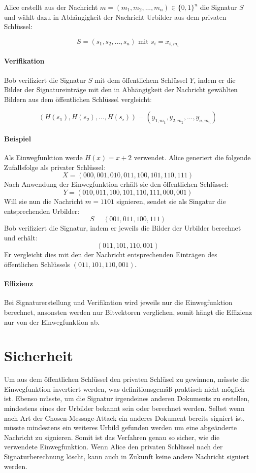 \documentclass[a4paper,12pt,oneside]{scrreprt}
\begin{document}
Alice erstellt aus der Nachricht $m = (m_1, m_2, \dots, m_n) \in \{0,1\}^n$ die Signatur $S$ und wählt dazu in Abhängigkeit der Nachricht Urbilder aus dem privaten Schlüssel:

\[ S = (s_1, s_2, \dots, s_n) \text{ mit } s_i = x_{i,m_i}\]

\paragraph{Verifikation}

Bob verifiziert die Signatur $S$ mit dem öffentlichem Schlüssel $Y$, indem er die Bilder der Signatureinträge mit den in Abhängigkeit der Nachricht gewählten Bildern aus dem öffentlichen Schlüssel vergleicht: 

\[ (H(s_1),H(s_2),\dots,H(s_i)) = (y_{1,m_1},y_{2,m_2},\dots,y_{n,m_n})\]

\paragraph{Beispiel}

Als Einwegfunktion werde $H(x) = x + 2$ verwendet. Alice generiert die folgende Zufallsfolge als privater Schlüssel:
\[X = (000,001,010,011,100,101,110,111)\]
Nach Anwendung der Einwegfunktion erhält sie den öffentlichen Schlüssel:
\[Y = (010,011,100,101,110,111,000,001)\]
Will sie nun die Nachricht $m = 1101$ signieren, sendet sie als Singatur die entsprechenden Urbilder:
\[S = (001,011,100,111)\]
Bob verifiziert die Signatur, indem er jeweils die Bilder der Urbilder berechnet und erhält:
\[(011,101,110,001)\]
Er vergleicht dies mit den der Nachricht entsprechenden Einträgen des öffentlichen Schlüssels  $(011,101,110,001)$.

\paragraph{Effizienz}

Bei Signaturerstellung und Verifikation wird jeweils nur die Einwegfunktion berechnet, ansonsten werden nur Bitvektoren verglichen, somit hängt die Effizienz nur von der Einwegfunktion ab. 

\section{Sicherheit}

Um aus dem öffentlichen Schlüssel den privaten Schlüsel zu gewinnen, müsste die Einwegfunktion invertiert werden, was definitionsgemäß praktisch nicht möglich ist. Ebenso müsste, um die Signatur irgendeines anderen Dokuments zu erstellen, mindestens eines der Urbilder bekannt sein oder berechnet werden. Selbst wenn nach Art der Chosen-Message-Attack ein anderes Dokument bereits signiert ist, müsste mindestens ein weiteres Urbild gefunden werden um eine abgeänderte Nachricht zu signieren. Somit ist das Verfahren genau so sicher, wie die verwendete Einwegfunktion. Wenn Alice den privaten Schlüssel nach der Signaturberechnung löscht, kann auch in Zukunft keine andere Nachricht signiert werden. 
\end{document}
